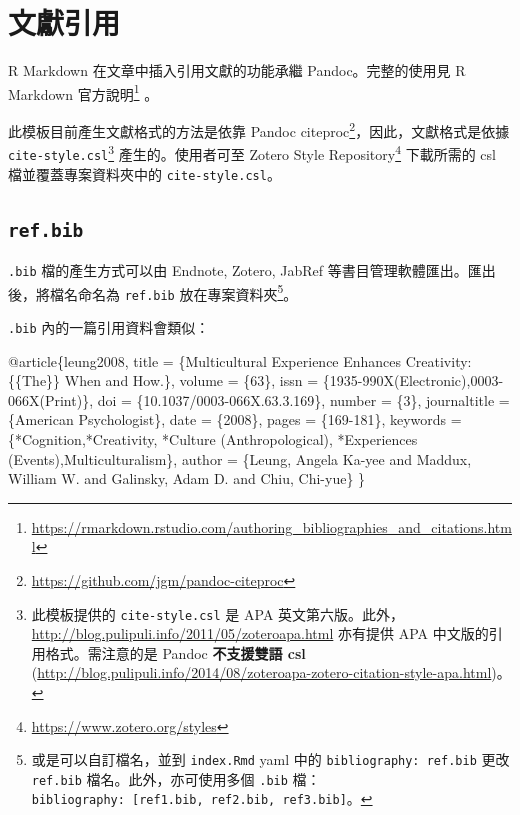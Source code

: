 \documentclass[]{book}
\newenvironment{Shaded}{}{}
\newcommand{\DataTypeTok}[1]{\textcolor[rgb]{0.56,0.13,0.00}{#1}}
\newcommand{\NormalTok}[1]{#1}
\newcommand{\OtherTok}[1]{\textcolor[rgb]{0.00,0.44,0.13}{#1}}
\newcommand{\VariableTok}[1]{\textcolor[rgb]{0.10,0.09,0.49}{#1}}
\renewcommand{\href}[2]{#2\footnote{\url{#1}}}
\begin{document}
\hypertarget{bib-cite}{%
\section{文獻引用}\label{bib-cite}}

R Markdown 在文章中插入引用文獻的功能承繼 Pandoc。完整的使用見
\href{https://rmarkdown.rstudio.com/authoring_bibliographies_and_citations.html}{R
Markdown 官方說明} 。

此模板目前產生文獻格式的方法是依靠
\href{https://github.com/jgm/pandoc-citeproc}{Pandoc
citeproc}，因此，文獻格式是依據 \texttt{cite-style.csl}\footnote{此模板提供的
  \texttt{cite-style.csl} 是 APA
  英文第六版。此外，\url{http://blog.pulipuli.info/2011/05/zoteroapa.html}
  亦有提供 APA 中文版的引用格式。需注意的是 Pandoc \textbf{不支援雙語
  csl}
  (\url{http://blog.pulipuli.info/2014/08/zoteroapa-zotero-citation-style-apa.html})。}
產生的。使用者可至 \href{https://www.zotero.org/styles}{Zotero Style
Repository} 下載所需的 csl 檔並覆蓋專案資料夾中的
\texttt{cite-style.csl}。

\hypertarget{ref-bib}{%
\subsection{\texorpdfstring{\texttt{ref.bib}}{ref.bib}}\label{ref-bib}}

\texttt{.bib} 檔的產生方式可以由 Endnote, Zotero, JabRef
等書目管理軟體匯出。匯出後，將檔名命名為 \texttt{ref.bib}
放在專案資料夾\footnote{或是可以自訂檔名，並到 \texttt{index.Rmd} yaml
  中的 \texttt{bibliography:\ ref.bib} 更改 \texttt{ref.bib}
  檔名。此外，亦可使用多個 \texttt{.bib}
  檔：\texttt{bibliography:\ {[}ref1.bib,\ ref2.bib,\ ref3.bib{]}}。}。

\texttt{.bib} 內的一篇引用資料會類似：

\begin{Shaded}
\begin{Highlighting}[]
\VariableTok{@article}\NormalTok{\{}\OtherTok{leung2008}\NormalTok{,}
  \DataTypeTok{title}\NormalTok{ = \{Multicultural Experience Enhances Creativity: \{\{The\}\} When and How.\},}
  \DataTypeTok{volume}\NormalTok{ = \{63\},}
  \DataTypeTok{issn}\NormalTok{ = \{1935{-}990X(Electronic),0003{-}066X(Print)\},}
  \DataTypeTok{doi}\NormalTok{ = \{10.1037/0003{-}066X.63.3.169\},}
  \DataTypeTok{number}\NormalTok{ = \{3\},}
  \DataTypeTok{journaltitle}\NormalTok{ = \{American Psychologist\},}
  \DataTypeTok{date}\NormalTok{ = \{2008\},}
  \DataTypeTok{pages}\NormalTok{ = \{169{-}181\},}
  \DataTypeTok{keywords}\NormalTok{ = \{*Cognition,*Creativity,}
\NormalTok{    *Culture (Anthropological),}
\NormalTok{    *Experiences (Events),Multiculturalism\},}
  \DataTypeTok{author}\NormalTok{ = \{Leung, Angela Ka{-}yee and }
\NormalTok{    Maddux, William W. and }
\NormalTok{    Galinsky, Adam D. and Chiu, Chi{-}yue\}}
\NormalTok{\}}
\end{Highlighting}
\end{Shaded}
\end{document}
